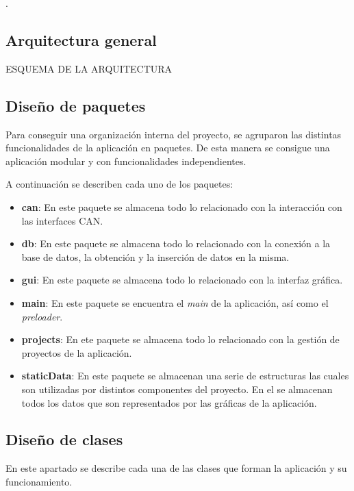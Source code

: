 .

\subsection{Arquitectura general}

ESQUEMA DE LA ARQUITECTURA

\subsection{Diseño de paquetes}

Para conseguir una organización interna del proyecto, se agruparon las distintas funcionalidades de la aplicación en paquetes. De esta manera se consigue una aplicación modular y con funcionalidades independientes.


A continuación se describen cada uno de los paquetes:

\begin{itemize}
\item
\textbf{can}: En este paquete se almacena todo lo relacionado con la interacción con las interfaces CAN.
\item
\textbf{db}: En este paquete se almacena todo lo relacionado con la conexión a la base de datos, la obtención y la inserción de datos en la misma.
\item
\textbf{gui}: En este paquete se almacena todo lo relacionado con la interfaz gráfica. 
\item
\textbf{main}: En este paquete se encuentra el \emph{main} de la aplicación, así como el \emph{preloader}.
\item
\textbf{projects}: En ete paquete se almacena todo lo relacionado con la gestión de proyectos de la aplicación.
\item
\textbf{staticData}: En este paquete se almacenan una serie de estructuras las cuales son utilizadas por distintos componentes del proyecto. En el se almacenan todos los datos que son representados por las gráficas de la aplicación.
\end{itemize}


\subsection{Diseño de clases}

En este apartado se describe cada una de las clases que forman la aplicación y su funcionamiento.

